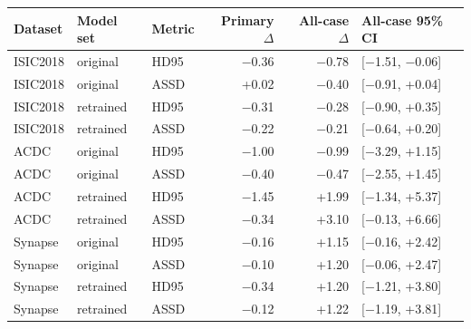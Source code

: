\begin{tabular}{lllrrl}
\toprule
Dataset & Model set & Metric & Primary $\Delta$ & All-case $\Delta$ & All-case 95\% CI \\
\midrule
ISIC2018 & original & HD95 & $-$0.36 & $-$0.78 & [$-$1.51, $-$0.06] \\
ISIC2018 & original & ASSD & +0.02 & $-$0.40 & [$-$0.91, +0.04] \\
ISIC2018 & retrained & HD95 & $-$0.31 & $-$0.28 & [$-$0.90, +0.35] \\
ISIC2018 & retrained & ASSD & $-$0.22 & $-$0.21 & [$-$0.64, +0.20] \\
ACDC & original & HD95 & $-$1.00 & $-$0.99 & [$-$3.29, +1.15] \\
ACDC & original & ASSD & $-$0.40 & $-$0.47 & [$-$2.55, +1.45] \\
ACDC & retrained & HD95 & $-$1.45 & +1.99 & [$-$1.34, +5.37] \\
ACDC & retrained & ASSD & $-$0.34 & +3.10 & [$-$0.13, +6.66] \\
Synapse & original & HD95 & $-$0.16 & +1.15 & [$-$0.16, +2.42] \\
Synapse & original & ASSD & $-$0.10 & +1.20 & [$-$0.06, +2.47] \\
Synapse & retrained & HD95 & $-$0.34 & +1.20 & [$-$1.21, +3.80] \\
Synapse & retrained & ASSD & $-$0.12 & +1.22 & [$-$1.19, +3.81] \\
\bottomrule
\end{tabular}
